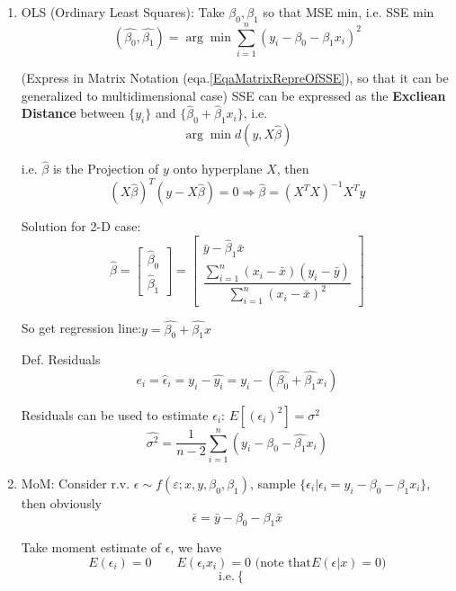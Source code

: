     \begin{enumerate}
        \item OLS (Ordinary Least Squares): Take $\beta_0,\beta_1$ so that MSE min, i.e. SSE min
        \[
            (\hat{\beta_0},\hat{\beta_1})=\arg\min\sum_{i=1}^n(y_i-\beta_0-\beta_1 x_i)^2    
        \]

        (Express in Matrix Notation (eqa.\ref{EqaMatrixRepreOfSSE}), so that it can be generalized to multidimensional case) SSE can be expressed as the \textbf{Excliean Distance }between $ \{y_i\} $ and $ \{\hat{\beta}_0+\hat{\beta}_1x_i\}  $, i.e.
        \[
            \arg\min d(y
            ,X \hat{\beta})
        \]

         i.e. $ \hat{\beta} $ is the Projection of $y $ onto hyperplane $ X $, then
         \[
            ( X\hat{\beta} )^T(y- X\hat{\beta})=0 \Rightarrow \hat{\beta}=(X^TX)^{-1}X^Ty 
         \]
        

        Solution for 2-D case:
        \[
            \hat{\beta}=\begin{bmatrix}
                \hat{\beta}_0\\ \hat{\beta}_1
            \end{bmatrix}
            =
            \begin{bmatrix}
            \bar{y}- \hat{\beta}_1\bar{x}\\
            \dfrac{\sum\limits_{i=1}^n(x_i-\bar{x})(y_i-\bar{y})}{\sum\limits_{i=1}^n(x_i-\bar{x})^2}
            \end{bmatrix}
        \]


        So get regression line:$y=\hat{\beta_0}+\hat{\beta_1}x$

        Def. Residuals
        \[e_i=\hat{\epsilon}_i=y_i-\hat{y_i}=y_i-(\hat{\beta_0}+\hat{\beta_1}x_i)\]


        Residuals can be used to estimate $\epsilon_i$: $E[(\epsilon_i)^2]=\sigma^2$
        \[\hat{\sigma^2}=\frac{1}{n-2}\sum_{i=1}^n(y_i-\hat{\beta_0}-\hat{\beta_1}x_i)\]

    \item MoM: Consider r.v. $\epsilon\sim f(\varepsilon;x,y,\beta_0,\beta_1)$, sample $\{\epsilon_i|\epsilon_i=y_i-\beta_0-\beta_1x_i\}$, then obviously
        \[\bar{\epsilon}=\bar{y}-\beta_0-\beta_1\bar{x}\]

        Take moment estimate of $\epsilon$, we have 
        \[E(\epsilon_i)=0\qquad E(\epsilon_i x_i)=0\text{ (note that}E(\epsilon|x)=0)\]
        \[\text{i.e.}\begin{cases}
            

\end{cases}\]
\end{enumerate}
